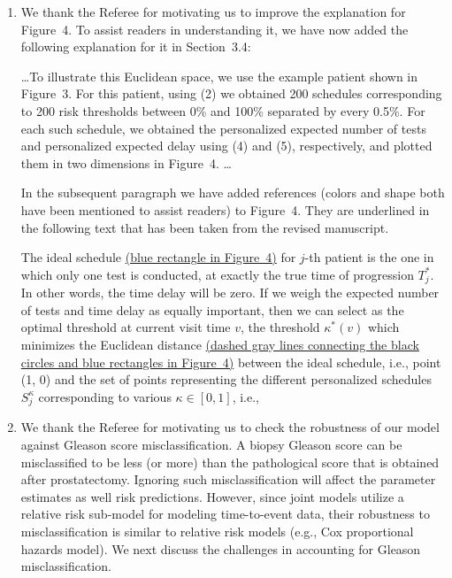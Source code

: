 \begin{enumerate}
\item \textbf{\color{blue}{Figure 4 is presented without much explanation. It is difficult to understand.}}

We thank the Referee for motivating us to improve the explanation for Figure~4. To assist readers in understanding it, we have now added the following explanation for it in Section~3.4:
\begin{shadequote}
\ldots To illustrate this Euclidean space, we use the example patient shown in Figure~3. For this patient, using (2) we obtained 200 schedules corresponding to 200 risk thresholds between 0\% and 100\% separated by every 0.5\%. For each such schedule, we obtained the personalized expected number of tests and personalized expected delay using (4) and (5), respectively, and plotted them in two dimensions in Figure~4. \ldots
\end{shadequote}
In the subsequent paragraph we have added references (colors and shape both have been mentioned to assist readers) to Figure~4. They are underlined in the following text that has been taken from the revised manuscript.
\begin{shadequote}
The ideal schedule \underline{(blue rectangle in Figure~4)} for $j$-th patient is the one in which only one test is conducted, at exactly the true time of progression $T^*_j$. In other words, the time delay will be zero. If we weigh the expected number of tests and time delay as equally important, then we can select as the optimal threshold at current visit time $v$, the threshold $\kappa^*(v)$ which minimizes the Euclidean distance \underline{(dashed gray lines connecting the black circles and blue rectangles in Figure~4)} between the ideal schedule, i.e., point (1, 0) and the set of points representing the different personalized schedules $S^{\kappa}_j$ corresponding to various $\kappa \in [0, 1]$, i.e.,
\end{shadequote}

\item \textbf{\color{blue}{In Section 4.1, the automatic chosen threshold $\kappa^*(v)$ should be listed. The details of how $\kappa^*(v)$ is estimated in the real data and how the testing schedule is determined as in Figure 5 should be given. Also, in Figure 5, when k = 10\%, how the testing schedule is determined should be also given as there is a large time gap between the two tests after year 6.}}

We thank the Referee for motivating us to check the robustness of our model against Gleason score misclassification. A biopsy Gleason score can be misclassified to be less (or more) than the pathological score that is obtained after prostatectomy. Ignoring such misclassification will affect the parameter estimates as well risk predictions. However, since joint models utilize a relative risk sub-model for modeling time-to-event data, their robustness to misclassification is similar to relative risk models (e.g., Cox proportional hazards model). We next discuss the challenges in accounting for Gleason misclassification. 


\end{enumerate}
